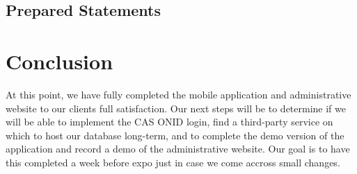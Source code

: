 \documentclass[onecolumn, draftclsnofoot,10pt, compsoc]{IEEEtran}
\begin{document}
  \subsection{Prepared Statements}

\section{Conclusion}
At this point, we have fully completed the mobile application and administrative website to our clients full satisfaction. Our next steps will be to determine if we will be able to implement the CAS ONID login, find a
third-party service on which to host our database long-term, and to complete the demo version of the application and record a demo of the administrative website. Our goal is to have this completed a week before expo just in
case we come accross small changes.
\end{document}
